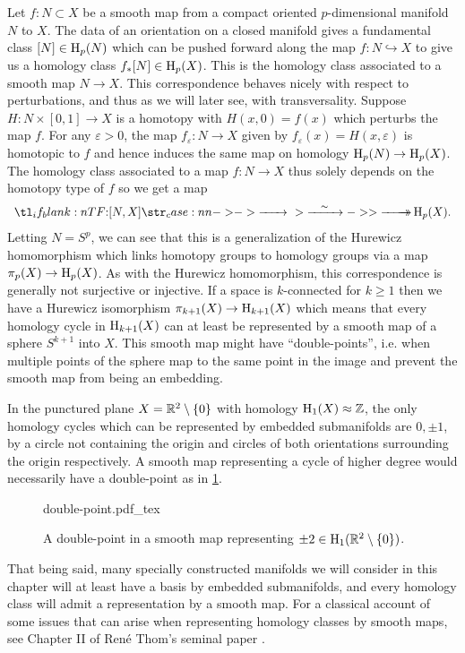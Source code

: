 Let $f : N\subset X$ be a smooth map from a compact oriented $p$-dimensional manifold $N$ to $X$. The data of an orientation on a closed manifold gives a fundamental class $[N]\in \operatorname{H}_p(N)$ which can be pushed forward along the map $f : N \hookrightarrow X$ to give us a homology class $f_* [N]\in \operatorname{H}_p(X)$. This is the homology class associated to a smooth map $N\to X$.
This correspondence behaves nicely with respect to perturbations, and thus as we will later see, with transversality.
Suppose $H : N\times [0,1] \to X$ is a homotopy with $H(x,0)=f(x)$ which perturbs the map $f$. For any $\varepsilon>0$, the map $f_\varepsilon : N \to X$ given by $f_\varepsilon(x)=H(x,\varepsilon)$ is homotopic to $f$ and hence induces the same map on homology $\operatorname{H}_p(N)\to \operatorname{H}_p(X)$. The homology class associated to a map $f : N \to X$ thus solely depends on the homotopy type of $f$ so we get a map
\[
	\lkxfunc{}{[N,X]}{\H_p(X).}
\]
Letting $N=S^p$, we can see that this is a generalization of the Hurewicz homomorphism which links homotopy groups to homology groups via a map $\pi_p(X) \to \operatorname{H}_p(X)$.
As with the Hurewicz homomorphism, this correspondence is generally not surjective or injective. If a space is $k$-connected for $k\geq 1$ then we have a Hurewicz isomorphism $\pi_{k+1}(X) \to \operatorname{H}_{k+1}(X)$ which means that every homology cycle in $\operatorname{H}_{k+1}(X)$ can at least be represented by a smooth map of a sphere $S^{k+1}$ into $X$. This smooth map might have ``double-points'', i.e. when multiple points of the sphere map to the same point in the image and prevent the smooth map from being an embedding.

\begin{example}
	In the punctured plane $X=\mathbb{R}^2\setminus \{0\}$ with homology $\operatorname{H}_1(X)\approx \mathbb{Z}$, the only homology cycles which can be represented by embedded submanifolds are $0,\pm 1$, by a circle not containing the origin and circles of both orientations surrounding the origin respectively. A smooth map representing a cycle of higher degree would necessarily have a double-point as in \cref{fig:double-point}.
\end{example}

\begin{figure}[ht]
	\centering
	{double-point.pdf_tex}
	\caption{A double-point in a smooth map representing $\pm 2\in \operatorname{H}_1(\mathbb{R}^2\setminus\{0\})$.}\label{fig:double-point}
\end{figure}

That being said, many specially constructed manifolds we will consider in this chapter will at least have a basis by embedded submanifolds, and every homology class will admit a representation by a smooth map. For a classical account of some issues that can arise when representing homology classes by smooth maps, see Chapter II of Ren\'e Thom's seminal paper \cite{thom1954}.

